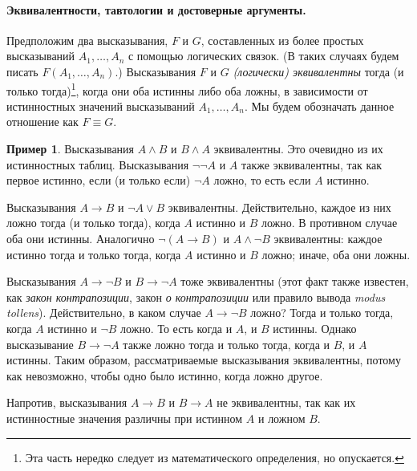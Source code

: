 \documentclass[12pt,notitlepage]{article}
\theoremstyle{plain}
\theoremstyle{definition}
\newtheorem{exm}[thm]{Пример}
\theoremstyle{plain}
\newcommand{\1}{\mathbf{1}}
\newcommand{\0}{\mathbf{0}}
\newcommand{\mcomm}[1]{}
\begin{document}
\paragraph{Эквивалентности, тавтологии и достоверные аргументы.} Предположим два высказывания, $F$ и $G$, составленных из более простых высказываний $A_1,\ldots,A_n$ с помощью логических связок. (В таких случаях будем писать $F(A_1,\ldots,A_n)$.) Высказывания $F$ и $G$ \emph{(логически) эквивалентны} тогда (и только тогда)\footnote{Эта часть нередко следует из математического определения, но опускается.}, когда они оба истинны либо оба ложны, в зависимости от истинностных значений высказываний $A_1,\ldots, A_n$. Мы будем обозначать данное отношение как $F \equiv G$.
\begin{exm}
	Высказывания $A \wedge B$ и $B \wedge A$ эквивалентны. Это очевидно из их истинностных таблиц. Высказывания $\neg \neg A$ и $A$ также эквивалентны, так как первое истинно, если (и только если) $\neg A$ ложно, то есть если $A$ истинно. 
	
	Высказывания $A \to B$ и $\neg A \vee B$ эквивалентны. Действительно, каждое из них ложно тогда (и только тогда), когда $A$ истинно и $B$ ложно. В противном случае оба они истинны. Аналогично $\neg(A \to B)$ и $A \wedge \neg B$ эквивалентны: каждое истинно тогда и только тогда, когда $A$ истинно и $B$ ложно; иначе, оба они ложны.
	
	Высказывания $A \to \neg B$ и $B \to \neg A$ тоже эквивалентны (этот факт также известен, как \emph{закон контрапозиции}, закон \emph{о контрапозиции} или правило вывода \emph{modus tollens}). Действительно, в каком случае $A \to \neg B$ ложно? Тогда и только тогда, когда $A$ истинно и $\neg B$ ложно. То есть когда и $A$, и $B$ истинны. Однако высказывание $B \to \neg A$ также ложно тогда и только тогда, когда и $B$, и $A$ истинны. Таким образом, рассматриваемые высказывания эквивалентны, потому как невозможно, чтобы одно было истинно, когда ложно другое.
	
	
	
	Напротив, высказывания $A \to B$ и $B \to A$ не эквивалентны, так как их истинностные значения различны при истинном $A$ и ложном $B$.
\end{exm}
\mcomm{}
\end{document}
